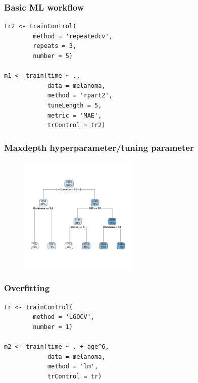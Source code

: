 \documentclass[handout, aspectratio = 169]{beamer}
\begin{document}
\begin{frame}[fragile]
\frametitle{Basic ML workflow}
\begin{Verbatim}
tr2 <- trainControl(
        method = 'repeatedcv',
        repeats = 3,
        number = 5)

m1 <- train(time ~ ., 
            data = melanoma,
            method = 'rpart2',
            tuneLength = 5,
            metric = 'MAE',
            trControl = tr2)

\end{Verbatim}

\end{frame} 




\begin{frame}
\frametitle{Maxdepth hyperparameter/tuning parameter}
\vspace{-4mm}
\begin{figure}
    \includegraphics[width = 0.5\textwidth]{rpart_tree.pdf}
\end{figure} 

\end{frame} 







\begin{frame}[fragile]
\frametitle{Overfitting}
\renewcommand{\FancyVerbFormatLine}[1]{%
   \ifnum\value{FancyVerbLine}=7\color{cyan}#1%
   \else #1\fi}
\begin{Verbatim}
tr <- trainControl(
        method = 'LGOCV',
        number = 1)

m2 <- train(time ~ . + age^6, 
            data = melanoma,
            method = 'lm',
            trControl = tr)

\end{Verbatim}

\end{frame} 
\end{document}
